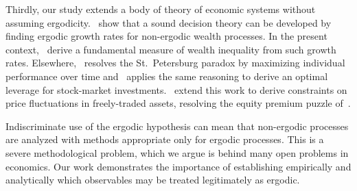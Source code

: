 Thirdly, our study extends a body of theory of economic systems without assuming ergodicity.~\cite{PetersGell-Mann2016} show that a sound decision theory can be developed by finding ergodic growth rates for non-ergodic wealth processes. In the present context,~\cite{AdamouPeters2016} derive a fundamental measure of wealth inequality from such growth rates. Elsewhere,~\cite{Peters2011b} resolves the St.~Petersburg paradox by maximizing individual performance over time and~\cite{Peters2011a} applies the same reasoning to derive an optimal leverage for stock-market investments.~\cite{PetersAdamou2013} extend this work to derive constraints on price fluctuations in freely-traded assets, resolving the equity premium puzzle of~\cite{MehraPrescott1985}.

Indiscriminate use of the ergodic hypothesis can mean that non-ergodic processes are analyzed with methods appropriate only for ergodic processes. This is a severe methodological problem, which we argue is behind many open problems in economics. Our work demonstrates the importance of establishing empirically and analytically which observables may be treated legitimately as ergodic.





